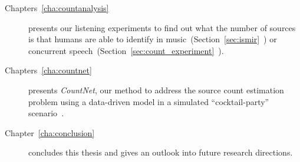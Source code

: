 \begin{description}
  \item[Chapters~\ref{cha:countanalysis}] presents our listening experiments to find out what the number of sources is that humans are able to identify in music~(Section~\ref{sec:ismir}~\cite{schoeffler13, stoeter13}) or concurrent speech~(Section~\ref{sec:count_experiment}~\cite{stoeter19, stoeter18}). 
  \item[Chapters~\ref{cha:countnet}] presents \emph{CountNet}, our method to address the source count estimation problem using a data-driven model in a simulated ``cocktail-party'' scenario~\cite{stoeter19}.
  \item[Chapter~\ref{cha:conclusion}] concludes this thesis and gives an outlook into future research directions.
\end{description}
